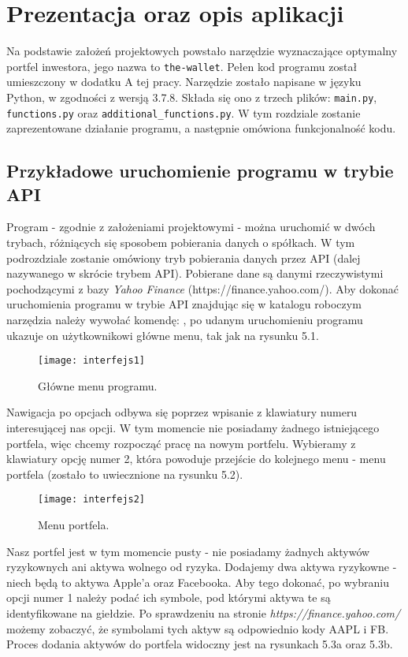 \documentclass[magister]{dyplom}
\def\code#1{\texttt{#1}}
\begin{document}
\chapter{Prezentacja oraz opis aplikacji}

Na podstawie założeń projektowych powstało narzędzie wyznaczające optymalny portfel inwestora, jego nazwa to \code{the-wallet}. Pełen kod programu został umieszczony w dodatku A tej pracy. Narzędzie zostało napisane w języku Python, w zgodności z wersją 3.7.8. Składa się ono z trzech plików: \code{main.py}, \code{functions.py} oraz \code{additional\_functions.py}. W tym rozdziale zostanie zaprezentowane działanie programu, a następnie omówiona funkcjonalność kodu.

\section{Przykładowe uruchomienie programu w trybie API}

Program - zgodnie z założeniami projektowymi - można uruchomić w dwóch trybach, różniących się sposobem pobierania danych o spółkach. W tym podrozdziale zostanie omówiony tryb pobierania danych przez API (dalej nazywanego w skrócie trybem API). Pobierane dane są danymi rzeczywistymi pochodzącymi z bazy \textit{Yahoo Finance} (https://finance.yahoo.com/). Aby dokonać uruchomienia programu w trybie API znajdując się w katalogu roboczym narzędzia należy wywołać komendę:
, po udanym uruchomieniu programu ukazuje on użytkownikowi główne menu, tak jak na rysunku 5.1.

\begin{figure}[ht]
	\centering
	\texttt{[image: interfejs1]}
	\caption{Główne menu programu.}
\end{figure}
Nawigacja po opcjach odbywa się poprzez wpisanie z klawiatury numeru interesującej nas opcji. 
W tym momencie nie posiadamy żadnego istniejącego portfela, więc chcemy rozpocząć pracę na nowym portfelu. Wybieramy z klawiatury opcję numer 2, która powoduje przejście do kolejnego menu - menu portfela (zostało to uwiecznione na rysunku 5.2).
\newpage
\begin{figure}[ht]
	\centering
	\texttt{[image: interfejs2]}
	\caption{Menu portfela.}
\end{figure}
Nasz portfel jest w tym momencie pusty - nie posiadamy żadnych aktywów ryzykownych ani aktywa wolnego od ryzyka. Dodajemy dwa aktywa ryzykowne - niech będą to aktywa Apple'a oraz Facebooka. Aby tego dokonać, po wybraniu opcji numer 1 należy podać ich symbole, pod którymi aktywa te są identyfikowane na giełdzie. Po sprawdzeniu na stronie \textit{https://finance.yahoo.com/} możemy zobaczyć, że symbolami tych aktyw są odpowiednio kody AAPL i FB. Proces dodania aktywów do portfela widoczny jest na rysunkach 5.3a oraz 5.3b.
\end{document}
